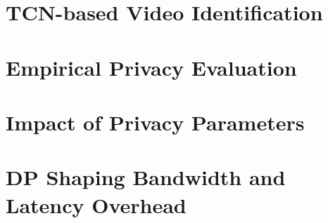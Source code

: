 \section{TCN-based Video Identification}\label{sec:eval-tcn}


\section{Empirical Privacy Evaluation}\label{sec:eval-empirical-privacy}


\section{Impact of Privacy Parameters}\label{sec:eval-privacy-params}


\section{DP Shaping Bandwidth and Latency Overhead}\label{sec:eval-bw}
